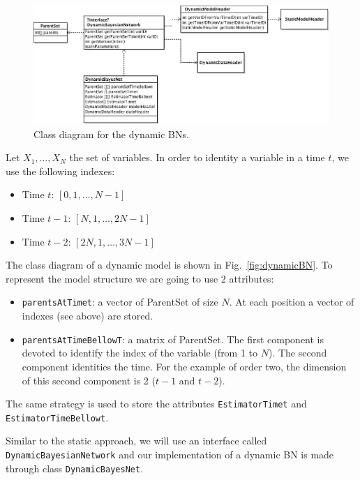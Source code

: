 \documentclass[a4paper,12pt]{article}
\begin{document}
\begin{figure}[h]
\includegraphics[width=\textwidth]{DynamicBN}
\caption{Class diagram for the dynamic BNs.}
\label{fig:classDiagramDynamicBN}
\end{figure}

Let $X_1,\ldots,X_N$ the set of variables. In order to identity a variable in a time $t$, we use the following indexes:

\begin{itemize}
\item Time $t$: $[0, 1, \ldots, N-1]$
\item Time $t-1$: $[N, 1, \ldots, 2N-1]$
\item Time $t-2$: $[2N, 1, \ldots, 3N-1]$
\end{itemize}

The class diagram of a dynamic model is shown in Fig.~\ref{fig:dynamicBN}. 
To represent the model structure we are going to use 2 attributes: 

\begin{itemize}
\item \texttt{parentsAtTimet}: a vector of ParentSet of size $N$. At each position a vector of indexes (see above) are stored. 
\item \texttt{parentsAtTimeBellowT}: a matrix of ParentSet. The first component is devoted to identify the index of the variable (from 1 to $N$).
The second component identities the time. For the example of order two, the dimension of this second component is 2 ($t-1$ and $t-2$).
\end{itemize}

The same strategy is used to store the attributes \texttt{EstimatorTimet} and \texttt{EstimatorTimeBellowt}.

Similar to the static approach, we will use an interface called 
\texttt{DynamicBayesianNetwork} and our implementation of a dynamic BN
is made through class \texttt{DynamicBayesNet}. 


\end{document}
